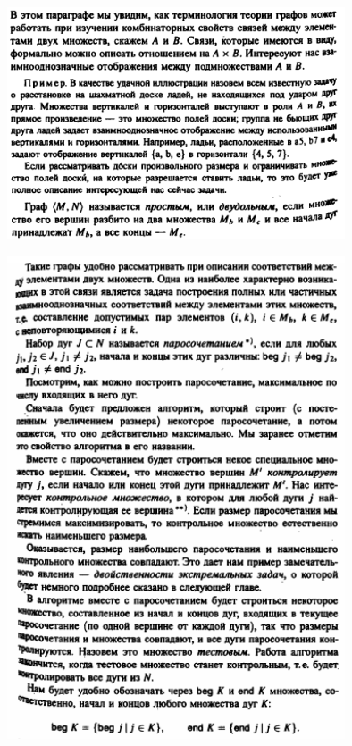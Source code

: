 \documentclass[discrete.tex]{subfiles}
\begin{document}
\begin{figure}[H]
        \includegraphics[width=10cm]{pics/49_1}
        \centering
\end{figure}

\begin{figure}[H]
        \includegraphics[width=10cm]{pics/49_2}
        \centering
\end{figure}
\end{document}
